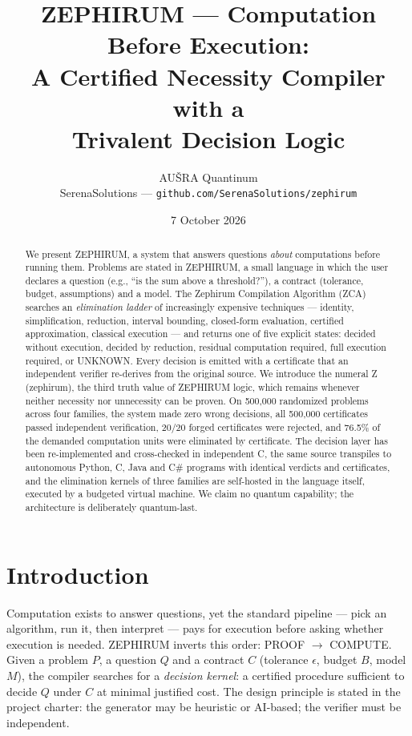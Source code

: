 \documentclass[11pt,a4paper]{article}
\title{ZEPHIRUM --- Computation Before Execution:\\
A Certified Necessity Compiler with a\\ Trivalent Decision Logic}
\author{AU\v{S}RA Quantinum\\
\small SerenaSolutions --- \texttt{github.com/SerenaSolutions/zephirum}}
\date{7 October 2026}
\begin{document}
\maketitle

\begin{abstract}
We present ZEPHIRUM, a system that answers questions \emph{about} computations
before running them. Problems are stated in ZEPHIRUM, a small language in which
the user declares a question (e.g., ``is the sum above a threshold?''), a
contract (tolerance, budget, assumptions) and a model. The Zephirum Compilation
Algorithm (ZCA) searches an \emph{elimination ladder} of increasingly expensive
techniques --- identity, simplification, reduction, interval bounding,
closed-form evaluation, certified approximation, classical execution --- and
returns one of five explicit states: decided without execution, decided by
reduction, residual computation required, full execution required, or UNKNOWN.
Every decision is emitted with a certificate that an independent verifier
re-derives from the original source. We introduce the numeral Z (zephirum), the
third truth value of ZEPHIRUM logic, which remains whenever neither necessity
nor unnecessity can be proven. On 500{,}000 randomized problems across four
families, the system made zero wrong decisions, all 500{,}000 certificates
passed independent verification, 20/20 forged certificates were rejected, and
76.5\% of the demanded computation units were eliminated by certificate. The
decision layer has been re-implemented and cross-checked in independent C, the
same source transpiles to autonomous Python, C, Java and C\# programs with
identical verdicts and certificates, and the elimination kernels of three
families are self-hosted in the language itself, executed by a budgeted
virtual machine. We claim no quantum capability; the architecture is
deliberately quantum-last.
\end{abstract}

\section{Introduction}
Computation exists to answer questions, yet the standard pipeline --- pick an
algorithm, run it, then interpret --- pays for execution before asking whether
execution is needed. ZEPHIRUM inverts this order: PROOF $\rightarrow$ COMPUTE.
Given a problem $P$, a question $Q$ and a contract $C$ (tolerance $\epsilon$,
budget $B$, model $M$), the compiler searches for a \emph{decision kernel}: a
certified procedure sufficient to decide $Q$ under $C$ at minimal justified
cost. The design principle is stated in the project charter: the generator may
be heuristic or AI-based; the verifier must be independent.
\end{document}
